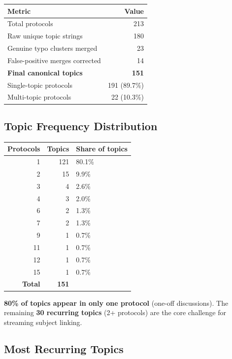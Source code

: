 \documentclass[11pt,a4paper]{article}
\begin{document}
\begin{center}
\begin{tabular}{lr}
\toprule
\textbf{Metric} & \textbf{Value} \\
\midrule
Total protocols & 213 \\
Raw unique topic strings & 180 \\
Genuine typo clusters merged & 23 \\
False-positive merges corrected & 14 \\
\textbf{Final canonical topics} & \textbf{151} \\
\midrule
Single-topic protocols & 191 \quad (89.7\%) \\
Multi-topic protocols & 22 \quad (10.3\%) \\
\bottomrule
\end{tabular}
\end{center}

\subsection*{Topic Frequency Distribution}

\begin{center}
\begin{tabular}{rrl}
\toprule
\textbf{Protocols} & \textbf{Topics} & \textbf{Share of topics} \\
\midrule
1  & 121 & 80.1\% \\
2  & 15  & 9.9\%  \\
3  & 4   & 2.6\%  \\
4  & 3   & 2.0\%  \\
6  & 2   & 1.3\%  \\
7  & 2   & 1.3\%  \\
9  & 1   & 0.7\%  \\
11 & 1   & 0.7\%  \\
12 & 1   & 0.7\%  \\
15 & 1   & 0.7\%  \\
\midrule
\textbf{Total} & \textbf{151} & \\
\bottomrule
\end{tabular}
\end{center}

\textbf{80\% of topics appear in only one protocol} (one-off discussions).
The remaining \textbf{30 recurring topics} (2+ protocols) are the core challenge
for streaming subject linking.

\subsection*{Most Recurring Topics}
\end{document}
